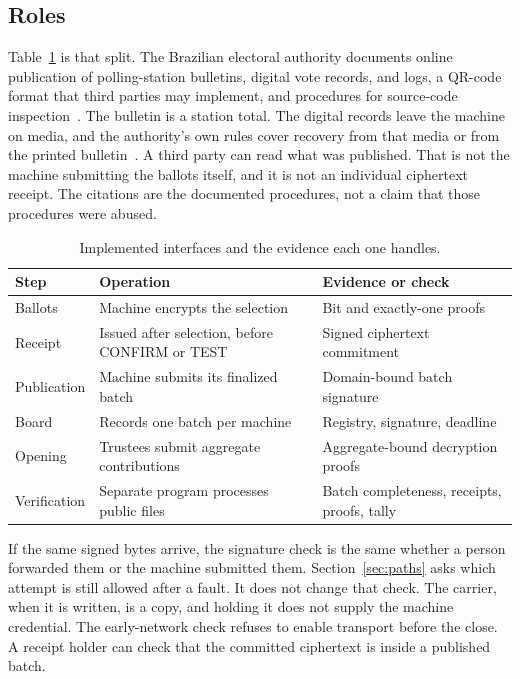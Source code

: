 \documentclass[11pt]{article}
\begin{document}
\subsection{Roles}
Table~\ref{tab:roles} is that split. The Brazilian electoral authority documents online publication of polling-station bulletins, digital vote records, and logs, a QR-code format that third parties may implement, and procedures for source-code inspection~\cite{tseAudit}. The bulletin is a station total. The digital records leave the machine on media, and the authority's own rules cover recovery from that media or from the printed bulletin~\cite{tseResolution}. A third party can read what was published. That is not the machine submitting the ballots itself, and it is not an individual ciphertext receipt. The citations are the documented procedures, not a claim that those procedures were abused.

\begin{table}[ht]
\centering
\caption{Implemented interfaces and the evidence each one handles.}
\label{tab:roles}
\small
\begin{tabular}{@{}>{\raggedright\arraybackslash}p{}>{\raggedright\arraybackslash}p{}>{\raggedright\arraybackslash}p{}@{}}
\toprule
Step & Operation & Evidence or check \\
\midrule
Ballots & Machine encrypts the selection & Bit and exactly-one proofs \\
Receipt & Issued after selection, before CONFIRM or TEST & Signed ciphertext commitment \\
Publication & Machine submits its finalized batch & Domain-bound batch signature \\
Board & Records one batch per machine & Registry, signature, deadline \\
Opening & Trustees submit aggregate contributions & Aggregate-bound decryption proofs \\
Verification & Separate program processes public files & Batch completeness, receipts, proofs, tally \\
\bottomrule
\end{tabular}
\end{table}

If the same signed bytes arrive, the signature check is the same whether a person forwarded them or the machine submitted them. Section~\ref{sec:paths} asks which attempt is still allowed after a fault. It does not change that check. The carrier, when it is written, is a copy, and holding it does not supply the machine credential. The early-network check refuses to enable transport before the close. A receipt holder can check that the committed ciphertext is inside a published batch.
\end{document}
